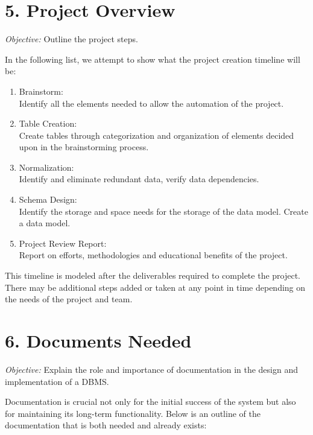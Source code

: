 \documentclass[12pt]{article}
\begin{document}
\section*{5. Project Overview}
\textit{Objective:} Outline the project steps. 

In the following list, we attempt to show what the project creation timeline will be:
\begin{enumerate}[labelindent=\parindent,leftmargin=!]
\item Brainstorm:\\
Identify all the elements needed to allow the automation of the project.
\item Table Creation:\\
Create tables through categorization and organization of elements decided upon in the brainstorming process.
\item Normalization:\\
Identify and eliminate redundant data, verify data dependencies. 
\item Schema Design:\\
Identify the storage and space needs for the storage of the data model. Create a data model. 
\item Project Review Report:\\
Report on efforts, methodologies and educational benefits of the project. 
\end{enumerate}
This timeline is modeled after the deliverables required to complete the project. There may be additional steps added or taken at any point in time depending on the needs of the project and team. 

\section*{6. Documents Needed}
\textit{Objective:} Explain the role and importance of documentation in the design and implementation of a DBMS.

\noindent
Documentation is crucial not only for the initial success of the system but also for maintaining its long-term functionality. Below is an outline of the documentation that is both needed and already exists:
\end{document}

